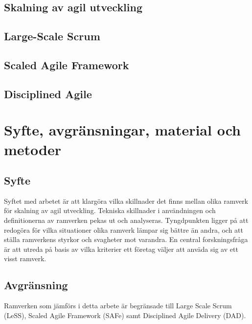 \subsection{Skalning av agil utveckling}



\subsection{Large-Scale Scrum}


\subsection{Scaled Agile Framework}


\subsection{Disciplined Agile}


	
\newpage

\section{Syfte, avgränsningar, material och metoder}


\subsection{Syfte}

Syftet med arbetet är att klargöra vilka skillnader det finns mellan olika ramverk för skalning av agil utveckling. Tekniska skillnader i användningen och definitionerna av ramverken pekas ut och analyseras.
Tyngdpunkten ligger på att redogöra för vilka situationer olika ramverk lämpar sig bättre än andra, och att ställa ramverkens styrkor och svagheter mot varandra. \newline
En central forskningsfråga är att utreda på basis av vilka kriterier ett företag väljer att anväda sig av ett visst ramverk.




\subsection{Avgränsning}

Ramverken som jämförs i detta arbete är begränsade till Large Scale Scrum (LeSS), Scaled Agile Framework (SAFe) samt Disciplined Agile Delivery (DAD).

